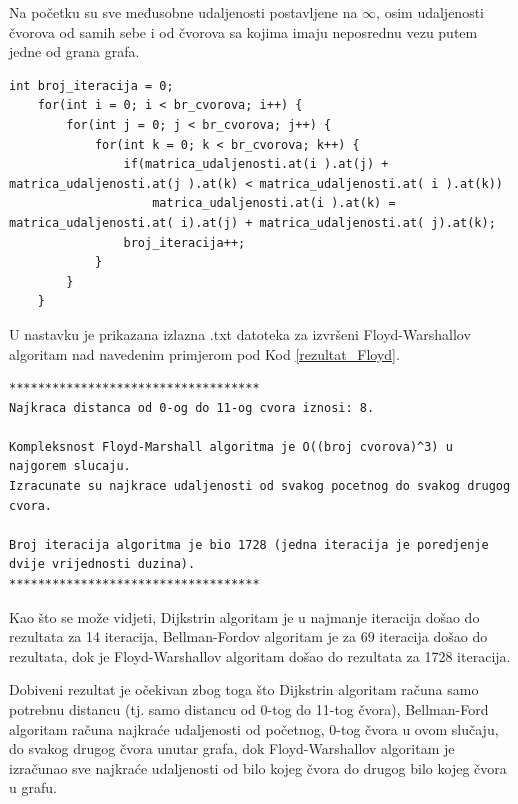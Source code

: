 \documentclass[conference]{IEEEtran}
\begin{document}
Na početku su sve međusobne udaljenosti postavljene na $\infty$, osim udaljenosti čvorova od samih sebe i od čvorova sa kojima imaju neposrednu vezu putem jedne od grana grafa. 

\begin{lstlisting}[caption=Implementirani kod za Floyd-Warshallov algoritam, label={Kod_Floyd_Warshall}]
    int broj_iteracija = 0;
    for(int i = 0; i < br_cvorova; i++) {
        for(int j = 0; j < br_cvorova; j++) {
            for(int k = 0; k < br_cvorova; k++) {
                if(matrica_udaljenosti.at(i ).at(j) + matrica_udaljenosti.at(j ).at(k) < matrica_udaljenosti.at( i ).at(k))
                    matrica_udaljenosti.at(i ).at(k) = matrica_udaljenosti.at( i).at(j) + matrica_udaljenosti.at( j).at(k);
                broj_iteracija++;
            }
        }
    }
\end{lstlisting}

U nastavku je prikazana izlazna .txt datoteka za izvršeni Floyd-Warshallov algoritam nad navedenim primjerom pod Kod \ref{rezultat_Floyd}. 


\begin{lstlisting}[caption=Rezultat ispisa za Dijkstrin algoritam, label={rezultat_Floyd}]
***********************************
Najkraca distanca od 0-og do 11-og cvora iznosi: 8.

Kompleksnost Floyd-Marshall algoritma je O((broj cvorova)^3) u najgorem slucaju.
Izracunate su najkrace udaljenosti od svakog pocetnog do svakog drugog cvora.

Broj iteracija algoritma je bio 1728 (jedna iteracija je poredjenje dvije vrijednosti duzina).
***********************************
\end{lstlisting}

Kao što se može vidjeti, Dijkstrin algoritam je u najmanje iteracija došao do rezultata za 14 iteracija, Bellman-Fordov algoritam je za 69 iteracija došao do rezultata, dok je Floyd-Warshallov algoritam došao do rezultata za 1728 iteracija.

Dobiveni rezultat je očekivan zbog toga što Dijkstrin algoritam računa samo potrebnu distancu (tj. samo distancu od 0-tog do 11-tog čvora), Bellman-Ford algoritam računa najkraće udaljenosti od početnog, 0-tog čvora u ovom slučaju, do svakog drugog čvora unutar grafa, dok Floyd-Warshallov algoritam je izračunao sve najkraće udaljenosti od bilo kojeg čvora do drugog bilo kojeg čvora u grafu.
\end{document}
